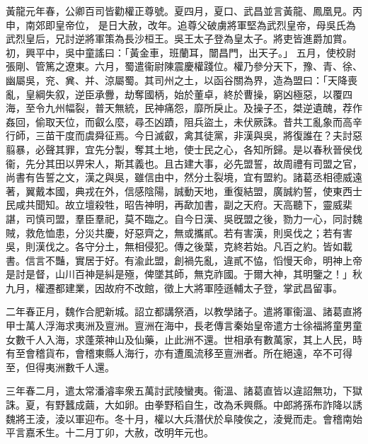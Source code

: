 \begin{pinyinscope}
 
黃龍元年春，公卿百司皆勸權正尊號。夏四月，夏口、武昌並言黃龍、鳳凰見。丙申，南郊即皇帝位，
 是日大赦，改年。追尊父破虜將軍堅為武烈皇帝，母吳氏為武烈皇后，兄討逆將軍策為長沙桓王。吳王太子登為皇太子。將吏皆進爵加賞。初，興平中，吳中童謠曰：「黃金車，班蘭耳，闓昌門，出天子。」
 五月，使校尉張剛、管篤之遼東。六月，蜀遣衞尉陳震慶權踐位。權乃參分天下，豫、青、徐、幽屬吳，兖、兾、并、涼屬蜀。其司州之土，以函谷關為界，造為盟曰：「天降喪亂，皇綱失叙，逆臣承釁，劫奪國柄，始於董卓，終於曹操，窮凶極惡，以覆四海，至令九州幅裂，普天無統，民神痛怨，靡所戾止。及操子丕，桀逆遺醜，荐作姦回，偷取天位，而叡么麼，尋丕凶蹟，阻兵盜土，未伏厥誅。昔共工亂象而高辛行師，三苗干度而虞舜征焉。今日滅叡，禽其徒黨，非漢與吳，將復誰在？夫討惡翦暴，必聲其罪，宜先分製，奪其土地，使士民之心，各知所歸。是以春秋晉侯伐衞，先分其田以畀宋人，斯其義也。且古建大事，必先盟誓，故周禮有司盟之官，尚書有告誓之文，漢之與吳，雖信由中，然分土裂境，宜有盟約。諸葛丞相德威遠著，翼戴本國，典戎在外，信感陰陽，誠動天地，重復結盟，廣誠約誓，使東西士民咸共聞知。故立壇殺牲，昭告神明，再歃加書，副之天府。天高聽下，靈威棐諶，司慎司盟，羣臣羣祀，莫不臨之。自今日漢、吳旣盟之後，勠力一心，同討魏賊，救危恤患，分災共慶，好惡齊之，無或攜貳。若有害漢，則吳伐之；若有害吳，則漢伐之。各守分土，無相侵犯。傳之後葉，克終若始。凡百之約。皆如載書。信言不豔，實居于好。有渝此盟，創禍先亂，違貳不恊，慆慢天命，明神上帝是討是督，山川百神是糾是殛，俾墜其師，無克祚國。于爾大神，其明鑒之！」秋九月，權遷都建業，因故府不改館，徵上大將軍陸遜輔太子登，掌武昌留事。
 
 
 
 
 二年春正月，魏作合肥新城。詔立都講祭酒，以教學諸子。遣將軍衞溫、諸葛直將甲士萬人浮海求夷洲及亶洲。亶洲在海中，長老傳言秦始皇帝遣方士徐福將童男童女數千人入海，求蓬萊神山及仙藥，止此洲不還。世相承有數萬家，其上人民，時有至會稽貨布，會稽東縣人海行，亦有遭風流移至亶洲者。所在絕遠，卒不可得至，但得夷洲數千人還。
 
 
 
 
 三年春二月，遣太常潘濬率衆五萬討武陵蠻夷。衞溫、諸葛直皆以違詔無功，下獄誅。夏，有野蠶成繭，大如卵。由拳野稻自生，改為禾興縣。中郎將孫布詐降以誘魏將王淩，淩以軍迎布。冬十月，權以大兵潛伏於阜陵俟之，淩覺而走。會稽南始平言嘉禾生。十二月丁卯，大赦，改明年元也。
 

\end{pinyinscope}
